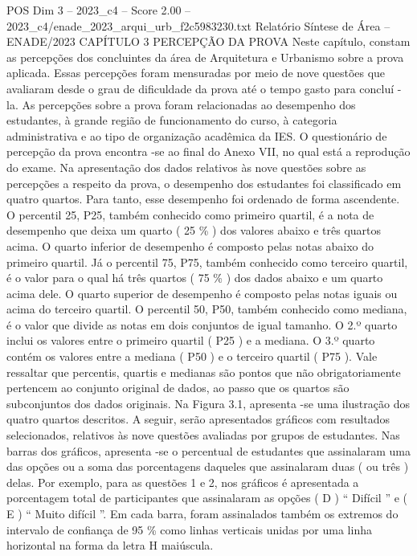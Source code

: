 \begin{textsample}{POS Dim 3 – 2023\_c4 – Score 2.00 – 2023\_c4/enade\_2023\_arqui\_urb\_f2c5983230.txt}  \label{ex:f3_pos_091}
Relatório Síntese de Área – ENADE/2023 CAPÍTULO 3 PERCEPÇÃO DA PROVA Neste capítulo, constam as percepções dos concluintes da área de Arquitetura e Urbanismo sobre a prova aplicada.
Essas percepções foram mensuradas por meio de nove questões que avaliaram desde o grau de dificuldade da prova até o tempo gasto para concluí -la.
As percepções sobre a prova foram relacionadas ao desempenho dos estudantes, à grande região de funcionamento do curso, à categoria administrativa e ao tipo de organização acadêmica da IES.
O questionário de percepção da prova encontra -se ao final do Anexo VII, no qual está a reprodução do exame.
Na apresentação dos dados relativos às nove questões sobre as percepções a respeito da prova, o desempenho dos estudantes foi classificado em quatro quartos.
Para tanto, esse desempenho foi ordenado de forma ascendente.
O percentil 25, P25, também conhecido como primeiro quartil, é a nota de desempenho que deixa um quarto ( 25 \% ) dos valores abaixo e três quartos acima.
O quarto inferior de desempenho é composto pelas notas abaixo do primeiro quartil.
Já o percentil 75, P75, também conhecido como terceiro quartil, é o valor para o qual há três quartos ( 75 \% ) dos dados abaixo e um quarto acima dele.
O quarto superior de desempenho é composto pelas notas iguais ou acima do terceiro quartil.
O percentil 50, P50, também conhecido como mediana, é o valor que divide as notas em dois conjuntos de igual tamanho.
O 2.º quarto inclui os valores entre o primeiro quartil ( P25 ) e a mediana.
O 3.º quarto contém os valores entre a mediana ( P50 ) e o terceiro quartil ( P75 ).
Vale ressaltar que percentis, quartis e medianas são pontos que não obrigatoriamente pertencem ao conjunto original de dados, ao passo que os quartos são subconjuntos dos dados originais.
Na Figura 3.1, apresenta -se uma ilustração dos quatro quartos descritos.
A seguir, serão apresentados gráficos com resultados selecionados, relativos às nove questões avaliadas por grupos de estudantes.
Nas barras dos gráficos, apresenta -se o percentual de estudantes que assinalaram uma das opções ou a soma das porcentagens daqueles que assinalaram duas ( ou três ) delas.
Por exemplo, para as questões 1 e 2, nos gráficos é apresentada a porcentagem total de participantes que assinalaram as opções ( D ) “ Difícil ” e ( E ) “ Muito difícil ”.
Em cada barra, foram assinalados também os extremos do intervalo de confiança de 95 \% como linhas verticais unidas por uma linha horizontal na forma da letra H maiúscula.

\end{textsample}
